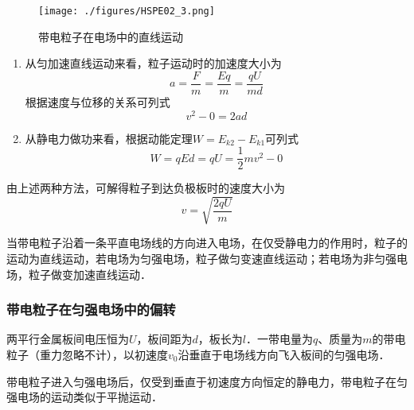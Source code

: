 \begin{figure}[ht]
\centering
\texttt{[image: ./figures/HSPE02\_3.png]}
\caption{带电粒子在电场中的直线运动} \label{HSPE02_fig3}
\end{figure}

\begin{enumerate}
\item 从匀加速直线运动来看，粒子运动时的加速度大小为
\begin{equation}
a = \frac{F}{m} = \frac{Eq}{m} = \frac{qU}{md}
\end{equation}
根据速度与位移的关系可列式
\begin{equation}
v^2 - 0 = 2ad
\end{equation}

\item 从静电力做功来看，根据动能定理$W=E_{k2}-E_{k1}$可列式
\begin{equation}
W=qEd=qU=\frac12 mv^2 - 0
\end{equation}
\end{enumerate}

由上述两种方法，可解得粒子到达负极板时的速度大小为
\begin{equation}
v=\sqrt{\frac{2qU}{m}}
\end{equation}

当带电粒子沿着一条平直电场线的方向进入电场，在仅受静电力的作用时，粒子的运动为直线运动，若电场为匀强电场，粒子做匀变速直线运动；若电场为非匀强电场，粒子做变加速直线运动．

\subsubsection{带电粒子在匀强电场中的偏转}

两平行金属板间电压恒为$U$，板间距为$d$，板长为$l$．一带电量为$q$、质量为$m$的带电粒子（重力忽略不计），以初速度$v_0$沿垂直于电场线方向飞入板间的匀强电场．

带电粒子进入匀强电场后，仅受到垂直于初速度方向恒定的静电力，带电粒子在匀强电场的运动类似于平抛运动．

